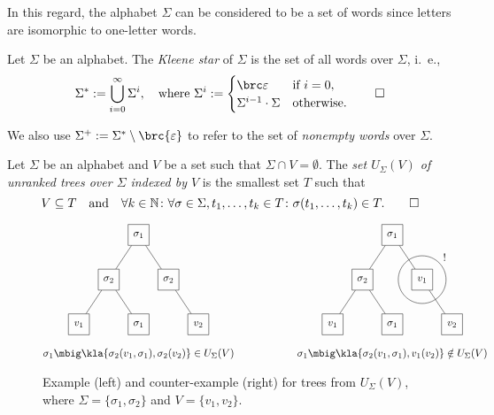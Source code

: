 In this regard, the alphabet $\Sigma$ can be considered to be a set of words
since letters are isomorphic to one-letter words.

\begin{definition}
 Let $\Sigma$ be an alphabet. The \emph{Kleene star} of $\Sigma$ is the set of
 all words over $\Sigma$, i.~e.,
 \[
  \Sigma^* := \bigcup_{i=0}^\infty \Sigma^i, \quad
  \text{where }\Sigma^i := \begin{cases}
   \brc\eps & \text{if } i = 0, \\
   \Sigma^{i-1}\cdot\Sigma & \text{otherwise}.
  \end{cases}\qedhere
 \]
\end{definition}

We also use $\Sigma^+ := \Sigma^* \setminus\brc{\eps}$ to refer to the set of
\emph{nonempty words} over $\Sigma$.

\begin{definition}
 Let $\Sigma$ be an alphabet and $V$ be a set such that $\Sigma\cap
 V=\emptyset$. The \emph{set $U_\Sigma(V)$ of unranked trees over $\Sigma$
 indexed by $V$} is the smallest set $T$ such that
 \[
  V \subseteq T \quad\text{and}\quad \forall k\in\mathbb N\colon \forall \sigma\in\Sigma, t_1,\ldots,t_k\in T\colon \sigma(t_1,\ldots,t_k)\in T.
  \qedhere
 \]
\end{definition}

\begin{figure}[t!]
 \[\begin{matrix}
  \begin{tikzpicture}[every node/.style={rectangle,draw,minimum size=2em},baseline=(current bounding box.center)]
   \node (n)   at (+0,+0.0) { $\sigma_1$ };
   \node (n1)  at (-1,-1.5) { $\sigma_2$ } edge (n);
   \node (n2)  at (+1,-1.5) { $\sigma_2$ } edge (n);
   \node (n11) at (-2,-3.0) { $v_1$ } edge (n1);
   \node (n12) at (+0,-3.0) { $\sigma_1$ } edge (n1);
   \node (n21) at (+2,-3.0) { $v_2$ } edge (n2);
  \end{tikzpicture}
  &\hspace*{4em}&
  \begin{tikzpicture}[every node/.style={rectangle,draw,minimum size=2em},baseline=(current bounding box.center)]
   \node (n)   at (+0,+0.0) { $\sigma_1$ };
   \node (n1)  at (-1,-1.5) { $\sigma_2$ } edge (n);
   \node (n2)  at (+1,-1.5) { $v_1$ } edge (n);
   \node (n11) at (-2,-3.0) { $v_1$ } edge (n1);
   \node (n12) at (+0,-3.0) { $\sigma_1$ } edge (n1);
   \node (n21) at (+2,-3.0) { $v_2$ } edge (n2);
   \draw (n2) circle (0.8);
   \node[draw=none] at (+1.75,-0.75) {!};
  \end{tikzpicture}
  \\\\
  \sigma_1\mbig\kla{\sigma_2(v_1,\sigma_1), \sigma_2(v_2)} \in U_\Sigma(V) &&
  \sigma_1\mbig\kla{\sigma_2(v_1,\sigma_1), v_1(v_2)} \notin U_\Sigma(V)
 \end{matrix}\]
 \caption{
  Example (left) and counter-example (right) for trees from $U_\Sigma(V)$,
  where $\Sigma = \{\sigma_1,\sigma_2\}$ and $V = \{v_1,v_2\}$.
  \label{fig:02-trees1}
 }
\end{figure}

